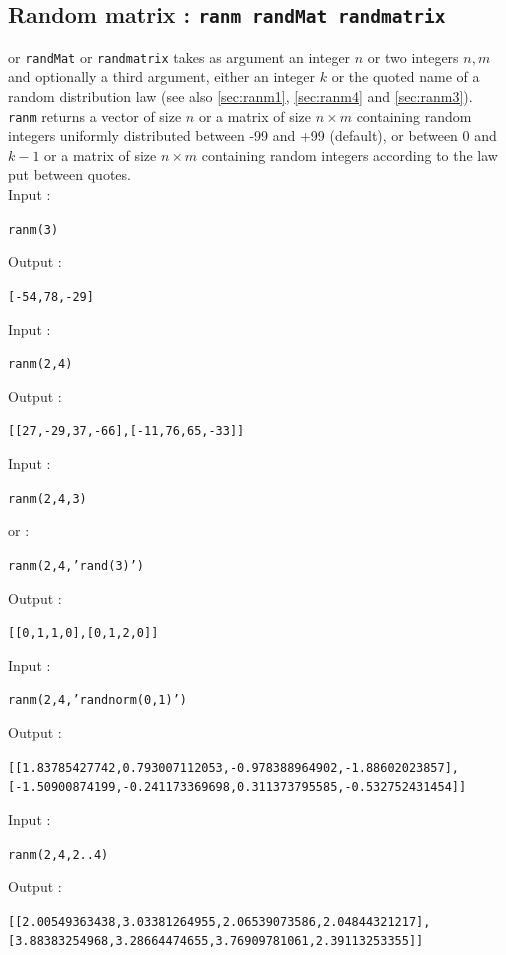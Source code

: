 \documentclass[a4paper,11pt]{book}
\begin{document}
\subsection{Random matrix : {\tt ranm randMat randmatrix}}\label{sec:ranm2}
 or {\tt randMat} or {\tt randmatrix} takes as argument an 
integer $n$ or two integers $n,m$ and optionally a third argument, either an 
integer $k$ or the quoted name of a random distribution law
(see also \ref{sec:ranm1}, \ref{sec:ranm4} and \ref{sec:ranm3}).\\
{\tt ranm} returns a vector of size $n$ or a matrix of size $n\times m$
 containing random integers uniformly distributed between -99 and +99 
(default), or between 0 and $k-1$ or  a matrix  of size $n\times m$
containing random integers according to the law put between quotes.\\
Input :
\begin{center}{\tt ranm(3)}\end{center}
Output :
\begin{center}{\tt [-54,78,-29]}\end{center}
Input :
\begin{center}{\tt ranm(2,4)}\end{center}
Output :
\begin{center}{\tt [[27,-29,37,-66],[-11,76,65,-33]]}\end{center}
Input :
\begin{center}{\tt ranm(2,4,3)}\end{center}
or :
\begin{center}{\tt ranm(2,4,'rand(3)')}\end{center}
Output :
\begin{center}{\tt [[0,1,1,0],[0,1,2,0]]}\end{center}
Input :
\begin{center}{\tt ranm(2,4,'randnorm(0,1)')}\end{center}
Output :
\begin{center}{\tt [[1.83785427742,0.793007112053,-0.978388964902,-1.88602023857], [-1.50900874199,-0.241173369698,0.311373795585,-0.532752431454]]}\end{center}
Input :
\begin{center}{\tt ranm(2,4,2..4)}\end{center}
Output :
\begin{center}{\tt [[2.00549363438,3.03381264955,2.06539073586,2.04844321217],
 [3.88383254968,3.28664474655,3.76909781061,2.39113253355]]}\end{center}
\end{document}
